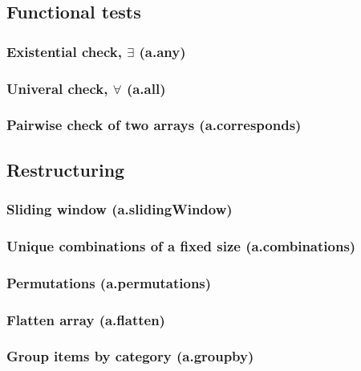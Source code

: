 \documentclass{article}
\theoremstyle{definition}
\begin{document}
\subsection{Functional tests}

\subsubsection{Existential check, $\exists$ (a.any)}

\subsubsection{Univeral check, $\forall$ (a.all)}

\subsubsection{Pairwise check of two arrays (a.corresponds)}

\subsection{Restructuring}

\subsubsection{Sliding window (a.slidingWindow)}

\subsubsection{Unique combinations of a fixed size (a.combinations)}

\subsubsection{Permutations (a.permutations)}

\subsubsection{Flatten array (a.flatten)}

\subsubsection{Group items by category (a.groupby)}
\end{document}
